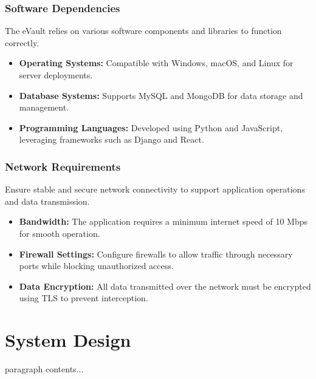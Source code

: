 \documentclass[12pt,a4paper]{report}
\begin{document}
   \subsection{Software Dependencies}
   The eVault relies on various software components and libraries to function correctly.
   \begin{itemize}
       \item \textbf{Operating Systems:} Compatible with Windows, macOS, and Linux for server deployments.
       \item \textbf{Database Systems:} Supports MySQL and MongoDB for data storage and management.
       \item \textbf{Programming Languages:} Developed using Python and JavaScript, leveraging frameworks such as Django and React.
   \end{itemize}
   
   \subsection{Network Requirements}
   Ensure stable and secure network connectivity to support application operations and data transmission.
   \begin{itemize}
       \item \textbf{Bandwidth:} The application requires a minimum internet speed of 10 Mbps for smooth operation.
       \item \textbf{Firewall Settings:} Configure firewalls to allow traffic through necessary ports while blocking unauthorized access.
       \item \textbf{Data Encryption:} All data transmitted over the network must be encrypted using TLS to prevent interception.
   \end{itemize}
\chapter{System Design}
paragraph contents... 
\end{document}
